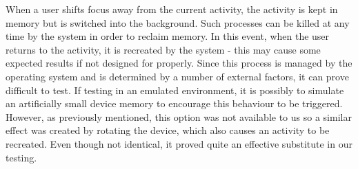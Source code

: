 When a user shifts focus away from the current activity, the activity is kept in memory but is switched into the background.  Such processes can be killed at any time by the system in order to reclaim memory.  In this event, when the user returns to the activity, it is recreated by the system - this may cause some expected results if not designed for properly.  Since this process is managed by the operating system and is determined by a number of external factors, it can prove difficult to test.  If testing in an emulated environment, it is possibly to simulate an artificially small device memory to encourage this behaviour to be triggered.  However, as previously mentioned, this option was not available to us so a similar effect was created by rotating the device, which also causes an activity to be recreated.  Even though not identical, it proved quite an effective substitute in our testing.

